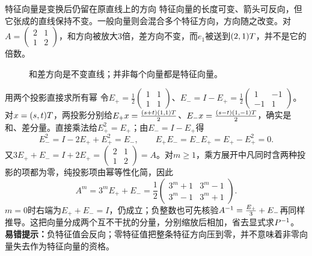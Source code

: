 \begin{insight}{特征向量是变换后仍留在原直线上的方向}
特征向量的长度可变、箭头可反向，但它张成的直线保持不变。一般向量则会混合多个特征方向，方向随之改变。对$A=\begin{pmatrix}2&1\\1&2\end{pmatrix}$，和方向被放大3倍，差方向不变，而$e_1$被送到$(2,1)T$，并不是它的倍数。
\end{insight}
\begin{figure}[H]\centering
{}
\caption{和差方向是不变直线；并非每个向量都是特征向量。}\label{fig:eigen-directions}
\end{figure}
\begin{clevertrick}{用两个投影直接求所有幂}
令$E_+=\frac12\begin{pmatrix}1&1\\1&1\end{pmatrix}$、$E_-=I-E_+=\frac12\begin{pmatrix}1&-1\\-1&1\end{pmatrix}$。对$x=(s,t)T$，两投影分别给$E_+x=\frac{(s+t)(1,1)T}{2}$、$E_-x=\frac{(s-t)(1,-1)T}{2}$，确实是和、差分量。直接乘法给$E_+^2=E_+$；由$E_-=I-E_+$得
\[E_-^2=I-2E_++E_+^2=E_-,\qquad E_+E_-=E_-E_+=E_+-E_+^2=0.\]
又$3E_++E_-=I+2E_+=\begin{pmatrix}2&1\\1&2\end{pmatrix}=A$。对$m\ge1$，乘方展开中凡同时含两种投影的项都为零，纯投影项由幂等性化简，因此
\[A^m=3^mE_++E_-=\dfrac12\begin{pmatrix}3^m+1&3^m-1\\3^m-1&3^m+1\end{pmatrix}.\]
$m=0$时右端为$E_++E_-=I$，仍成立；负整数也可先核验$A^{-1}=\frac{E_+}{3}+E_-$再同样推导。这把向量分成两个互不干扰的分量，分别缩放后相加，省去显式求$P^{-1}$。
\textbf{易错提示：}负特征值会反向；零特征值把整条特征方向压到零，并不意味着非零向量失去作为特征向量的资格。
\end{clevertrick}
